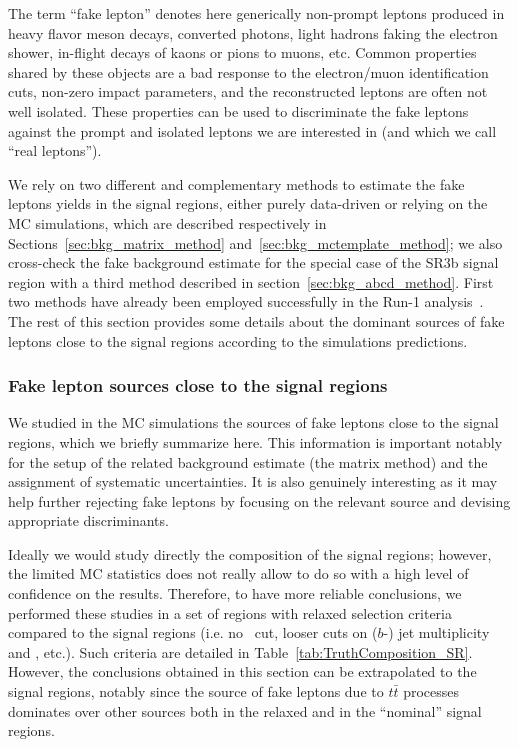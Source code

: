 The term ``fake lepton'' denotes here generically non-prompt leptons produced in heavy flavor meson decays, 
converted photons, light hadrons faking the electron shower, in-flight decays of kaons or pions to muons, etc.  
Common properties shared by these objects are a bad response to the electron/muon identification cuts, 
non-zero impact parameters, and the reconstructed leptons are often not well isolated. 
These properties can be used to discriminate the fake leptons against the prompt and isolated leptons we are interested in (and which we call ``real leptons''). 

We rely on two different and complementary methods to estimate the fake leptons yields in the signal regions, 
either purely data-driven or relying on the MC simulations, 
which are described respectively in Sections~\ref{sec:bkg_matrix_method} and~\ref{sec:bkg_mctemplate_method}; 
we also cross-check the fake background estimate for the special case of the SR3b signal region with a third method described in section~\ref{sec:bkg_abcd_method}. 
First two methods have already been employed successfully in the Run-1 analysis~\cite{noteSS3L}. 
The rest of this section provides some details about the dominant sources of fake leptons close to the signal regions according to the simulations predictions. 


\subsubsection{Fake lepton sources close to the signal regions} 
\label{sec:truthComposition_SR}

We studied in the MC simulations the sources of fake leptons close to the signal regions, which we briefly summarize here. 
This information is important notably for the setup of the related background estimate (the matrix method) and the assignment of systematic uncertainties. 
It is also genuinely interesting as it may help further rejecting fake leptons by focusing on the relevant source and devising appropriate discriminants. 

Ideally we would study directly the composition of the signal regions; 
however, the limited MC statistics does not really allow to do so with a high level of confidence on the results. 
Therefore, to have more reliable conclusions, we performed these studies in a set of regions with relaxed selection criteria compared to the signal regions (i.e. no \meff\ cut, looser cuts on ($b$-) jet multiplicity and \met, etc.). 
Such criteria are detailed in Table~\ref{tab:TruthComposition_SR}. 
However, the conclusions obtained in this section can be extrapolated to the signal regions, 
notably since the source of fake leptons due to $t\bar t$ processes dominates over other sources both in the relaxed and in the ``nominal'' signal regions. 

